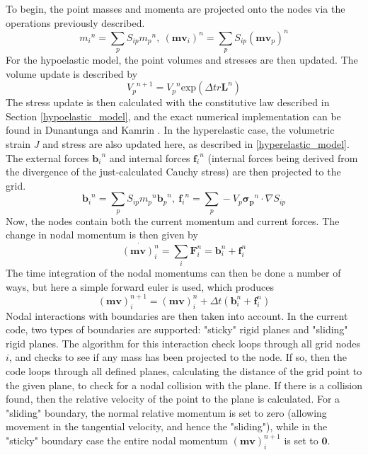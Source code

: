 To begin, the point masses and momenta are projected onto the nodes via the operations previously described. 
\begin{equation}
{m_i}^n=\sum_pS_{ip}{m_p}^n,\ ({{\bm{mv}}_i})^n=\sum_pS_{ip}({{\bm{mv}}_p})^n\label{mass_and_mom_projection}
\end{equation}
For the hypoelastic model, the point volumes and stresses are then updated. The volume update is described by
\begin{equation}
{V_p}^{n+1}={V_p}^n \text{exp}(\Delta tr\bm{L}^n) \label{volume_update}
\end{equation}
The stress update is then calculated with the constitutive law described in Section \ref{hypoelastic_model}, and the exact numerical implementation can be found in Dunantunga and Kamrin \cite{Dunatunga:2015:Continuum}. In the hyperelastic case, the volumetric strain $J$ and stress are also updated here, as described in \ref{hyperelastic_model}.
The external forces ${\bm{b}_i}^n$ and internal forces ${\bm{f}_i}^n$ (internal forces being derived from the divergence of the just-calculated Cauchy stress) are then projected to the grid.
\begin{equation}
{\bm{b}_i}^n=\sum_pS_{ip}{m_p}^n{\bm{b}_p}^n,\ {\bm{f}_i}^n=\sum_p -V_p\bm{{\sigma}_p}^n \cdot \nabla S_{ip}
\label{force_projection}
\end{equation}
Now, the nodes contain both the current momentum and current forces. The change in nodal momentum is then given by
\begin{equation}
\dot{(\bm{mv})^n_i}=\sum_{i}\bm{F}^n_i=\bm{b}^n_i+\bm{f}^n_i\label{momentum_rate}
\end{equation}
The time integration of the nodal momentums can then be done a number of ways, but here a simple forward euler is used, which produces
\begin{equation}
(\bm{mv})^{n+1}_i=(\bm{mv})^n_i+\Delta t(\bm{b}^n_i+\bm{f}^n_i)
\end{equation}
Nodal interactions with boundaries are then taken into account. In the current code, two types of boundaries are supported: "sticky" rigid planes and "sliding" rigid planes. The algorithm for this interaction check loops through all grid nodes $i$, and checks to see if any mass has been projected to the node. If so, then the code loops through all defined planes, calculating the distance of the grid point to the given plane, to check for a nodal collision with the plane. If there is a collision found, then the relative velocity of the point to the plane is calculated. For a "sliding" boundary, the normal relative momentum is set to zero (allowing movement in the tangential velocity, and hence the "sliding"), while in the "sticky" boundary case the entire nodal momentum $(\bm{mv})^{n+1}_i$ is set to $\bm{0}$.

